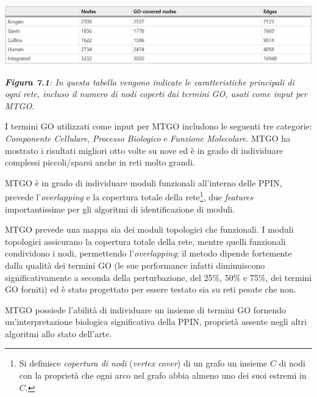 \documentclass[11pt]{article}
\begin{document}
\begin{center}
\includegraphics[scale=0.53]{tab1}

\begin{small}\textit{\textbf{Figura 7.1}: In questa tabella vengono indicate le caratteristiche principali di ogni rete, incluso il numero di nodi coperti dai termini GO, usati come input per MTGO}.\end{small}
\end{center}

I termini GO utilizzati come input per MTGO includono le seguenti tre categorie: \textit{Componente Cellulare}, \textit{Processo Biologico} e \textit{Funzione Molecolare}. 
MTGO ha mostrato i risultati migliori otto volte su nove ed è in grado di individuare complessi piccoli/sparsi anche in reti molto grandi.

MTGO è in grado di individuare moduli funzionali all'interno delle PPIN, prevede l'\textit{overlapping} e la copertura totale della rete\footnote{Si definisce \textit{copertura di nodi} (\textit{vertex cover}) di un grafo un insieme $C$ di nodi con la proprietà che ogni arco nel grafo abbia almeno uno dei suoi estremi in $C$.}, due \textit{features} importantissime per gli algoritmi di identificazione di moduli.

MTGO prevede una mappa sia dei moduli topologici che funzionali. I moduli topologici assicurano la copertura totale della rete, mentre quelli funzionali condividono i nodi, permettendo l'\textit{overlapping}; il metodo dipende fortemente dalla qualità dei termini GO (le sue performance infatti diminuiscono significativamente a seconda della perturbazione, del 25\%, 50\% e 75\%, dei termini GO forniti) ed è stato progettato per essere testato sia su reti pesate che non. 

MTGO possiede l'abilità di individuare un insieme di termini GO fornendo un'interpretazione biologica significativa della PPIN, proprietà assente negli altri algoritmi allo stato dell'arte.\\
\end{document}
